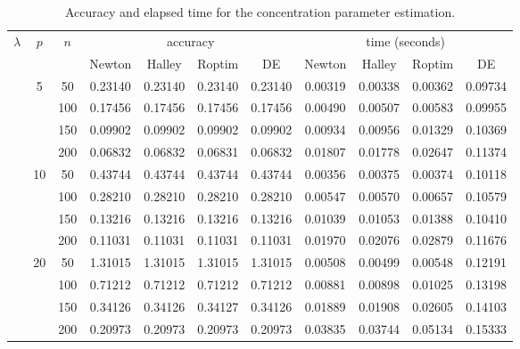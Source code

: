 \documentclass[11pt]{article}
\begin{document}
\begin{center}
	\begin{longtable}{|c|c|c|c|c|c|c|c|c|c|c|}
		\caption{Accuracy and elapsed time for the concentration parameter estimation.} \label{table:extended_concentration}\\
		\hline
		\multirow{2}{*}{$\lambda$} & \multirow{2}{*}{$p$} & \multirow{2}{*}{$n$} & \multicolumn{4}{c|}{accuracy} & \multicolumn{4}{c|}{time (seconds)} \\ \cline{4-11} 
		&                     &    & Newton & Halley & \textsf{Roptim} & \textsf{DE} & Newton & Halley & \textsf{Roptim} & \textsf{DE} \\ \hhline{|=|=|=|=|=|=|=|=|=|=|=|}
		\multirow{12}{*}{$1$}   
		& \multirow{4}{*}{5}  & 50  & 0.23140 & 0.23140 & 0.23140 & 0.23140 & 0.00319 & 0.00338 & 0.00362 & 0.09734\\ \cline{3-11} 
		&                     & 100 & 0.17456 & 0.17456 & 0.17456 & 0.17456 & 0.00490 & 0.00507 & 0.00583 & 0.09955\\ \cline{3-11} 
		&                     & 150 & 0.09902 & 0.09902 & 0.09902 & 0.09902 & 0.00934 & 0.00956 & 0.01329 & 0.10369\\ \cline{3-11} 
		&                     & 200 & 0.06832 & 0.06832 & 0.06831 & 0.06832 & 0.01807 & 0.01778 & 0.02647 & 0.11374\\ \cline{2-11} 
		& \multirow{4}{*}{10} & 50  & 0.43744 & 0.43744 & 0.43744 & 0.43744 & 0.00356 & 0.00375 & 0.00374 & 0.10118\\ \cline{3-11} 
		&                     & 100 & 0.28210 & 0.28210 & 0.28210 & 0.28210 & 0.00547 & 0.00570 & 0.00657 & 0.10579\\ \cline{3-11} 
		&                     & 150 & 0.13216 & 0.13216 & 0.13216 & 0.13216 & 0.01039 & 0.01053 & 0.01388 & 0.10410\\ \cline{3-11} 
		&                     & 200 & 0.11031 & 0.11031 & 0.11031 & 0.11031 & 0.01970 & 0.02076 & 0.02879 & 0.11676\\ \cline{2-11}
		& \multirow{4}{*}{20} & 50  & 1.31015 & 1.31015 & 1.31015 & 1.31015 & 0.00508 & 0.00499 & 0.00548 & 0.12191\\ \cline{3-11} 
		&                     & 100 & 0.71212 & 0.71212 & 0.71212 & 0.71212 & 0.00881 & 0.00898 & 0.01025 & 0.13198\\ \cline{3-11} 
		&                     & 150 & 0.34126 & 0.34126 & 0.34127 & 0.34126 & 0.01889 & 0.01908 & 0.02605 & 0.14103\\ \cline{3-11} 
		&                     & 200 & 0.20973 & 0.20973 & 0.20973 & 0.20973 & 0.03835 & 0.03744 & 0.05134 & 0.15333\\ \hline

\end{longtable}
\end{center}
\end{document}
